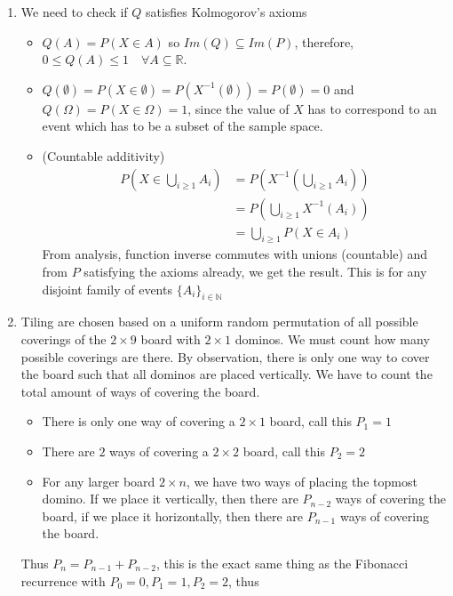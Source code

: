 \documentclass[12pt]{article}
\begin{document}
	\begin{enumerate}
		\item We need to check if $Q$ satisfies Kolmogorov's axioms
			\begin{itemize}
				\item $Q(A) = P(X \in A)$ so $Im(Q) \subseteq Im(P)$, therefore, $0 \leq Q(A) \leq 1 \quad \forall A \subseteq \mathbb{R}$.
				\item $Q(\emptyset) = P(X \in \emptyset) = P(X^{-1}(\emptyset)) = P(\emptyset) = 0$ and $Q(\Omega) = P(X \in \Omega) = 1$, since the value of $X$ has to correspond to an event which has to be a subset of the sample space. 
				\item (Countable additivity) \begin{align*} P\left(X \in \bigcup_{i \geq 1} A_i\right) &= P\left(X^{-1}\left(\bigcup_{i \geq 1}A_i\right)\right)\\
					&= P\left(\bigcup_{i \geq 1} X^{-1}(A_i)\right) \\
					&= \bigcup_{i \geq 1} P(X \in A_i)
					\end{align*}
					From analysis, function inverse commutes with unions (countable) and from $P$ satisfying the axioms already, we get the result. This is for any disjoint family of events $\{A_i\}_{i \in \mathbb{N}}$
			\end{itemize}
			\pagebreak
		\item Tiling are chosen based on a uniform random permutation of all possible coverings of the $2\times9$ board with $2\times1$ dominos. We must count how many possible coverings are there. By observation, there is only one way to cover the board such that all dominos are placed vertically. We have to count the total amount of ways of covering the board. 
			\begin{itemize}
				\item There is only one way of covering a $2\times 1$ board, call this $P_1 = 1$
				\item There are $2$ ways of covering a $2\times2$ board, call this $P_2 = 2$
				\item For any larger board $2\times n$, we have two ways of placing the topmost domino. If we place it vertically, then there are $P_{n-2}$ ways of covering the board, if we place it horizontally, then there are $P_{n-1}$ ways of covering the board.
			\end{itemize}
				 Thus $P_n = P_{n-1} + P_{n-2}$, this is the exact same thing as the Fibonacci recurrence with $P_0 = 0, P_1 = 1, P_2 = 2$, thus
				 \begin{align*}

\end{align*}
\end{enumerate}
\end{document}
